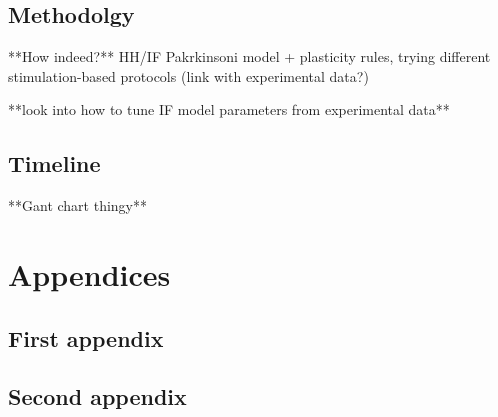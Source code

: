 \subsection{Methodolgy} **How indeed?** HH/IF Pakrkinsoni model + plasticity rules, trying
different stimulation-based protocols (link with experimental data?)

**look into how to tune IF model parameters from experimental data**

\subsection{Timeline}
**Gant chart thingy**



\newpage


\newpage

\appendix
\section*{Appendices}
\renewcommand{\thesubsection}{\Alph{subsection}}
\subsection{First appendix}
\subsection{Second appendix}


